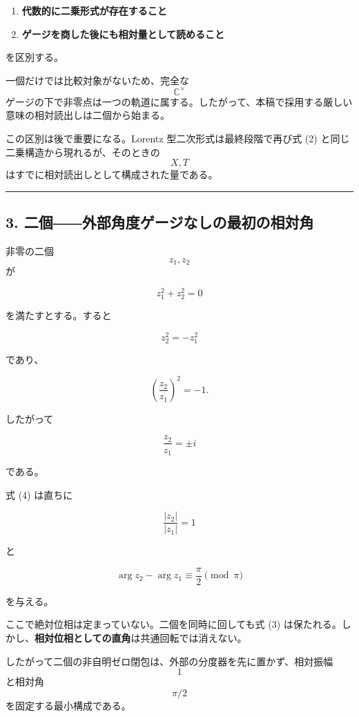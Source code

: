 \documentclass[
  a4paper,
]{ltjsarticle}
\providecommand{\tightlist}{%
  \setlength{\itemsep}{0pt}\setlength{\parskip}{0pt}}
\begin{document}
\begin{enumerate}
\def\labelenumi{\arabic{enumi}.}
\tightlist
\item
  \textbf{代数的に二乗形式が存在すること}
\item
  \textbf{ゲージを商した後にも相対量として読めること}
\end{enumerate}

を区別する。

一個だけでは比較対象がないため、完全な \[\mathbb C^\times\]
ゲージの下で非零点は一つの軌道に属する。したがって、本稿で採用する厳しい意味の相対読出しは二個から始まる。

この区別は後で重要になる。Lorentz 型二次形式は最終段階で再び式 (2)
と同じ二乗構造から現れるが、そのときの \[X,T\]
はすでに相対読出しとして構成された量である。

\begin{center}\rule{0.5\linewidth}{0.5pt}\end{center}

\subsection{3.
二個――外部角度ゲージなしの最初の相対角}\label{ux4e8cux500bux5916ux90e8ux89d2ux5ea6ux30b2ux30fcux30b8ux306aux3057ux306eux6700ux521dux306eux76f8ux5bfeux89d2}

非零の二個 \[z_1,z_2\] が

\[
z_1^2+z_2^2=0
\tag{3}
\]

を満たすとする。すると

\[
z_2^2=-z_1^2
\]

であり、

\[
\left(\frac{z_2}{z_1}\right)^2=-1.
\]

したがって

\[
\boxed{
\frac{z_2}{z_1}=\pm i
}
\tag{4}
\]

である。

式 (4) は直ちに

\[
\boxed{
\frac{|z_2|}{|z_1|}=1
}
\tag{5}
\]

と

\[
\boxed{
\arg z_2-\arg z_1
\equiv\frac{\pi}{2}
\pmod{\pi}
}
\tag{6}
\]

を与える。

ここで絶対位相は定まっていない。二個を同時に回しても式 (3)
は保たれる。しかし、\textbf{相対位相としての直角}は共通回転では消えない。

したがって二個の非自明ゼロ閉包は、外部の分度器を先に置かず、相対振幅
\[1\] と相対角 \[\pi/2\] を固定する最小構成である。
\end{document}
